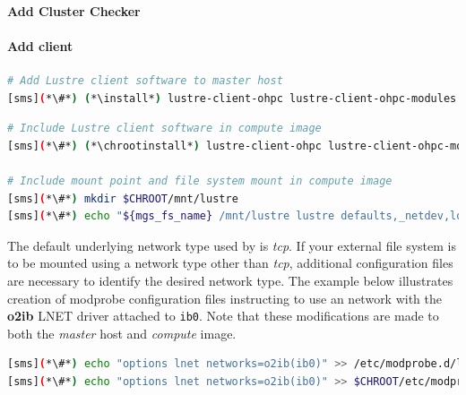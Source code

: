 \documentclass[letterpaper]{article}
\newcommand{\install}{yum -y install}
\newcommand{\chrootinstall}{yum -y --installroot=\$CHROOT install}
\begin{document}
\paragraph{Add Cluster Checker} \label{sec:add_clck}


\paragraph{Add \Lustre{} client} \label{sec:lustre_client}



\begin{lstlisting}[language=bash,keywords={},upquote=true]
# Add Lustre client software to master host
[sms](*\#*) (*\install*) lustre-client-ohpc lustre-client-ohpc-modules
\end{lstlisting}

\begin{lstlisting}[language=bash,keywords={},upquote=true]
# Include Lustre client software in compute image
[sms](*\#*) (*\chrootinstall*) lustre-client-ohpc lustre-client-ohpc-modules

# Include mount point and file system mount in compute image
[sms](*\#*) mkdir $CHROOT/mnt/lustre
[sms](*\#*) echo "${mgs_fs_name} /mnt/lustre lustre defaults,_netdev,localflock 0 0" >> $CHROOT/etc/fstab
\end{lstlisting}

The default underlying network type used by \Lustre{} is {\em tcp}. If your
external \Lustre{} file system is to be mounted using a network type other than
{\em tcp}, additional configuration files are necessary to identify the desired
network type. The example below illustrates creation of modprobe configuration files
instructing \Lustre{} to use an \InfiniBand{} network with the \textbf{o2ib} LNET driver
attached to \texttt{ib0}. Note that these modifications are made to both the
{\em master} host and {\em compute} image.

\begin{lstlisting}[language=bash,keywords={},upquote=true]
[sms](*\#*) echo "options lnet networks=o2ib(ib0)" >> /etc/modprobe.d/lustre.conf
[sms](*\#*) echo "options lnet networks=o2ib(ib0)" >> $CHROOT/etc/modprobe.d/lustre.conf
\end{lstlisting}
\end{document}
